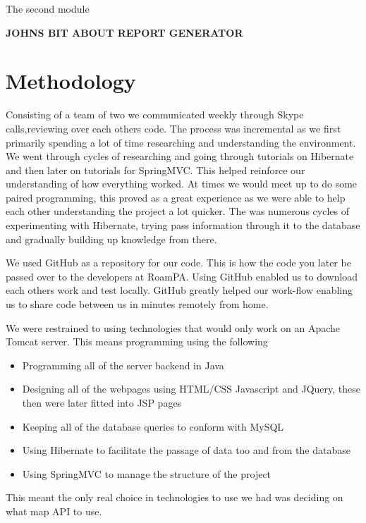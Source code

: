 The second module \newline

\textbf{JOHNS BIT ABOUT REPORT GENERATOR}


\chapter{Methodology}

Consisting of a team of two we communicated weekly through Skype calls,reviewing over each others code. The process was incremental as we first primarily spending a lot of time researching and understanding the environment. We went through cycles of researching and going through tutorials on Hibernate and then later on tutorials for SpringMVC. This helped reinforce our understanding of how everything worked. At times we would meet up to do some paired programming, this proved as a great experience as we were able to help each other understanding the project a lot quicker. The was numerous cycles of experimenting with Hibernate, trying pass information through it to the database and gradually building up knowledge from there. 

We used GitHub as a repository for our code. This is how the code you later be passed over to the developers at RoamPA. Using GitHub enabled us to download each others work and test locally. GitHub greatly helped our work-flow enabling us to share code between us in minutes remotely from home.

We were restrained to using technologies that would only work on an Apache Tomcat server. This means programming using the following

\begin{itemize}
	\item{Programming all of the server backend in Java}
	\item{Designing all of the webpages using HTML/CSS Javascript and JQuery, these then were later fitted into JSP pages}
	\item{Keeping all of the database queries to conform with MySQL}
	\item{Using Hibernate to facilitate the passage of data too and from the database}
	\item{Using SpringMVC to manage the structure of the project}
\end{itemize}

This meant the only real choice in technologies to use we had was deciding on what map API to use.

